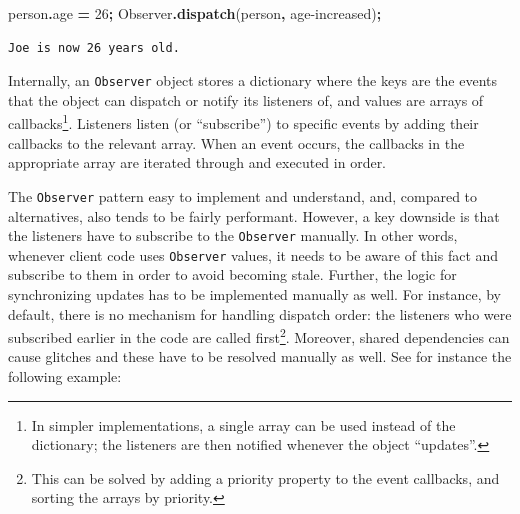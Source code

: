 \documentclass[
  openany]{book}
\newenvironment{Shaded}{\begin{snugshade}}{\end{snugshade}}
\newcommand{\AttributeTok}[1]{\textcolor[rgb]{0.13,0.29,0.53}{#1}}
\newcommand{\DecValTok}[1]{\textcolor[rgb]{0.00,0.00,0.81}{#1}}
\newcommand{\FunctionTok}[1]{\textcolor[rgb]{0.13,0.29,0.53}{\textbf{#1}}}
\newcommand{\NormalTok}[1]{#1}
\newcommand{\OperatorTok}[1]{\textcolor[rgb]{0.81,0.36,0.00}{\textbf{#1}}}
\newcommand{\VerbatimStringTok}[1]{\textcolor[rgb]{0.31,0.60,0.02}{#1}}
\theoremstyle{definition}
\theoremstyle{definition}
\theoremstyle{definition}
\theoremstyle{definition}
\theoremstyle{remark}
\begin{document}
\begin{Shaded}
\begin{Highlighting}[]
\NormalTok{person}\OperatorTok{.}\AttributeTok{age} \OperatorTok{=} \DecValTok{26}\OperatorTok{;}
\NormalTok{Observer}\OperatorTok{.}\FunctionTok{dispatch}\NormalTok{(person}\OperatorTok{,} \VerbatimStringTok{\textasciigrave{}age{-}increased\textasciigrave{}}\NormalTok{)}\OperatorTok{;}
\end{Highlighting}
\end{Shaded}

\begin{verbatim}
Joe is now 26 years old.
\end{verbatim}

Internally, an \texttt{Observer} object stores a dictionary where the keys are the events that the object can dispatch or notify its listeners of, and values are arrays of callbacks\footnote{In simpler implementations, a single array can be used instead of the dictionary; the listeners are then notified whenever the object ``updates''.}. Listeners listen (or ``subscribe'') to specific events by adding their callbacks to the relevant array. When an event occurs, the callbacks in the appropriate array are iterated through and executed in order.

The \texttt{Observer} pattern easy to implement and understand, and, compared to alternatives, also tends to be fairly performant. However, a key downside is that the listeners have to subscribe to the \texttt{Observer} manually. In other words, whenever client code uses \texttt{Observer} values, it needs to be aware of this fact and subscribe to them in order to avoid becoming stale. Further, the logic for synchronizing updates has to be implemented manually as well. For instance, by default, there is no mechanism for handling dispatch order: the listeners who were subscribed earlier in the code are called first\footnote{This can be solved by adding a priority property to the event callbacks, and sorting the arrays by priority.}. Moreover, shared dependencies can cause glitches and these have to be resolved manually as well. See for instance the following example:
\end{document}
